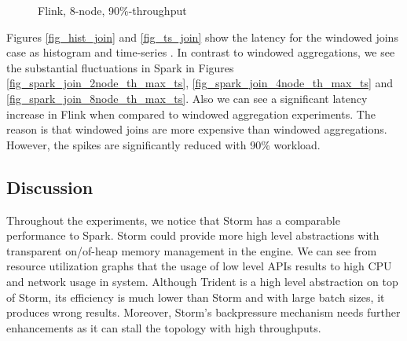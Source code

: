 {\begin{figure*}
\begin{subfigure}[b]{0.3\textwidth}
       \caption{Flink, 8-node,  90\%-throughput }
   \end{subfigure}

        \caption{Windowed join latency distributions in time series}
                \label{fig_ts_join}
\end{figure*}













Figures  \ref{fig_hist_join} and \ref{fig_ts_join} show the latency for the windowed joins case as  histogram and time-series .  In contrast to windowed aggregations, we see the substantial fluctuations in Spark in Figures \ref{fig_spark_join_2node_th_max_ts}, \ref{fig_spark_join_4node_th_max_ts} and \ref{fig_spark_join_8node_th_max_ts}.
Also we can see a significant latency increase in Flink when compared to windowed aggregation experiments. The reason is that windowed joins are   more expensive than windowed aggregations. However, the spikes are significantly reduced with 90\% workload.  


\subsection{Discussion}


 
Throughout the experiments, we notice that Storm has a comparable performance  to Spark. Storm could provide more high level abstractions  with transparent on/of-heap memory management in the engine. We can see from resource utilization graphs that the usage of low level APIs results to high CPU and network usage in system.  Although Trident is a high level abstraction on top of Storm, its efficiency is much lower than Storm and with large batch sizes, it produces wrong results. Moreover, Storm's backpressure mechanism needs further enhancements as it can stall the topology with high throughputs.

}
